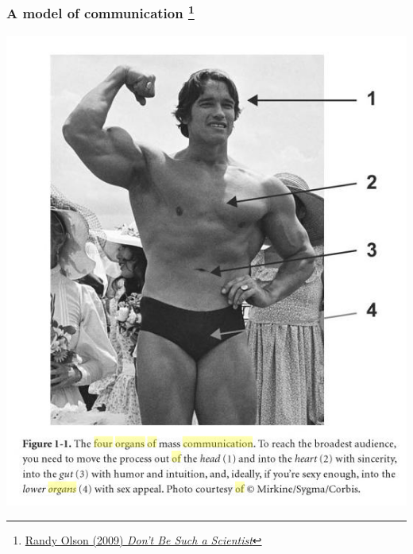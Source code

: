 \begin{frame}
  \frametitle{A model of communication
    \footnote{\tiny{\href{https://www.amazon.co.uk/Dont-Be-Such-Scientist-Substance}{Randy Olson (2009) \textit{Don't Be Such a Scientist}}}}
  }
  \begin{center}
    \includegraphics[height=0.8\textheight]{images/mass_communication_datavis}        
  \end{center}
\end{frame}